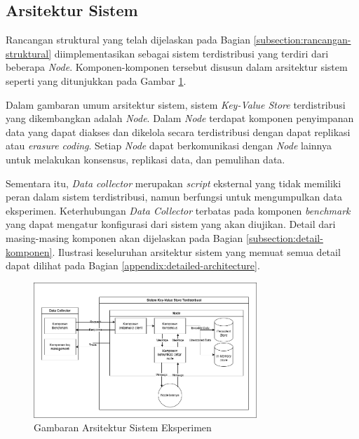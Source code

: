 \subsection{Arsitektur Sistem}
\label{subsection:system-architecture}

Rancangan struktural yang telah dijelaskan pada Bagian \ref{subsection:rancangan-struktural} diimplementasikan sebagai sistem terdistribusi yang terdiri dari beberapa \textit{Node}. Komponen-komponen tersebut disusun dalam arsitektur sistem seperti yang ditunjukkan pada Gambar \ref{fig:general-architecture}.

Dalam gambaran umum arsitektur sistem, sistem \textit{Key-Value Store} terdistribusi yang dikembangkan adalah \textit{Node}. Dalam \textit{Node} terdapat komponen penyimpanan data yang dapat diakses dan dikelola secara terdistribusi dengan dapat replikasi atau \textit{erasure coding}. Setiap \textit{Node} dapat berkomunikasi dengan \textit{Node} lainnya untuk melakukan konsensus, replikasi data, dan pemulihan data.

Sementara itu, \textit{Data collector} merupakan \textit{script} eksternal yang tidak memiliki peran dalam sistem terdistribusi, namun berfungsi untuk mengumpulkan data eksperimen. Keterhubungan \textit{Data Collector} terbatas pada komponen \textit{benchmark} yang dapat mengatur konfigurasi dari sistem yang akan diujikan. Detail dari masing-masing komponen akan dijelaskan pada Bagian \ref{subsection:detail-komponen}. Ilustrasi keseluruhan arsitektur sistem yang memuat semua detail dapat dilihat pada Bagian \ref{appendix:detailed-architecture}.

\begin{figure}[ht]
    \centering
    \includegraphics[width=0.75\textwidth]{resources/chapter-3/general-architecture.png}
    \caption{Gambaran Arsitektur Sistem Eksperimen}
    \label{fig:general-architecture}
\end{figure}

